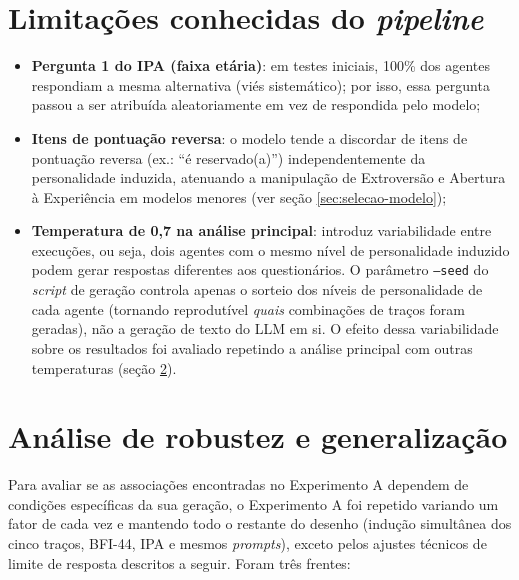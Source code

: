 \section{Limitações conhecidas do \textit{pipeline}}
\label{sec:limitacoes-pipeline}

\begin{itemize}
    \item \textbf{Pergunta 1 do IPA (faixa etária)}: em testes iniciais,
    100\% dos agentes respondiam a mesma alternativa (viés sistemático);
    por isso, essa pergunta passou a ser atribuída aleatoriamente em vez de
    respondida pelo modelo;
    \item \textbf{Itens de pontuação reversa}: o modelo tende a discordar
    de itens de pontuação reversa (ex.: ``é reservado(a)'') independentemente
    da personalidade induzida, atenuando a manipulação de Extroversão e
    Abertura à Experiência em modelos menores (ver seção
    \ref{sec:selecao-modelo});
    \item \textbf{Temperatura de 0,7 na análise principal}: introduz
    variabilidade entre execuções, ou seja, dois agentes com o mesmo nível
    de personalidade induzido podem gerar respostas diferentes aos
    questionários. O parâmetro \texttt{--seed} do
    \textit{script} de geração controla apenas o sorteio dos níveis de
    personalidade de cada agente (tornando reprodutível \textit{quais}
    combinações de traços foram geradas), não a geração de texto do LLM
    em si. O efeito dessa variabilidade sobre os resultados foi avaliado
    repetindo a análise principal com outras temperaturas (seção
    \ref{sec:metodo-robustez}).
\end{itemize}

\section{Análise de robustez e generalização}
\label{sec:metodo-robustez}

Para avaliar se as associações encontradas no Experimento A dependem de
condições específicas da sua geração, o Experimento A foi repetido
variando um fator de cada vez e mantendo todo o restante do desenho
(indução simultânea dos cinco traços, BFI-44, IPA e mesmos
\textit{prompts}), exceto pelos ajustes técnicos de limite de resposta
descritos a seguir. Foram três frentes:

